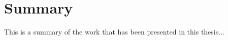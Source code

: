 \cleartoleftpage

\chapter{Summary}
\label{chap5}

This is a summary of the work that has been presented in this thesis...

\lipsum[1]
